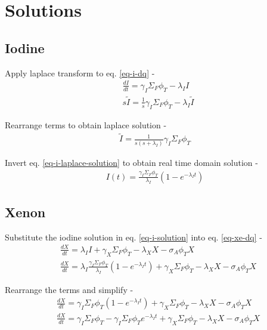 \documentclass[11pt,a4paper]{article}
\begin{document}
\section{Solutions}
\subsection{Iodine}
\noindent Apply laplace transform to eq. \ref{eq-i-dq} - 
\begin{equation} \label{eq-i-laplace-transform}
\begin{split}
& \frac{dI}{dt}=\gamma_I \Sigma_F \phi_T-\lambda_I I \\
& s\tilde{I}=\frac{1}{s}\gamma_I\Sigma_F\phi_T-\lambda_I\tilde{I}
\end{split}
\end{equation}

\noindent Rearrange terms to obtain laplace solution - 
\begin{equation} \label{eq-i-laplace-solution}
\begin{gathered}
\tilde{I}=\frac{1}{s(s+\lambda_I)}\gamma_I\Sigma_F\phi_T
\end{gathered}
\end{equation}

\noindent Invert eq. \ref{eq-i-laplace-solution} to obtain real time domain solution - 
\begin{equation} \label{eq-i-solution}
\begin{gathered}
I(t)=\frac{\gamma_I\Sigma_F\phi_T}{\lambda_I}(1-e^{-\lambda_I t})
\end{gathered}
\end{equation}

\subsection{Xenon}
\noindent Substitute the iodine solution in eq. \ref{eq-i-solution} into eq. \ref{eq-xe-dq} - 
\begin{equation} 
\begin{split}
& \frac{dX}{dt}=\lambda_I I + \gamma_X \Sigma_F \phi_T - \lambda_X X - \sigma_A \phi_T X \\
& \frac{dX}{dt}=\lambda_I \frac{\gamma_I\Sigma_F\phi_T}{\lambda_I}(1-e^{-\lambda_I t}) + \gamma_X \Sigma_F \phi_T - \lambda_X X - \sigma_A \phi_T X
\end{split}
\end{equation}

\noindent Rearrange the terms and simplify - 
\begin{equation} 
\begin{split}
& \frac{dX}{dt}=\gamma_I\Sigma_F\phi_T(1-e^{-\lambda_I t}) + \gamma_X \Sigma_F \phi_T - \lambda_X X - \sigma_A \phi_T X \\
& \frac{dX}{dt}=\gamma_I\Sigma_F\phi_T - \gamma_I\Sigma_F\phi_T e^{-\lambda_I t} + \gamma_X \Sigma_F \phi_T - \lambda_X X - \sigma_A \phi_T X 
\end{split}
\end{equation}
\end{document}
